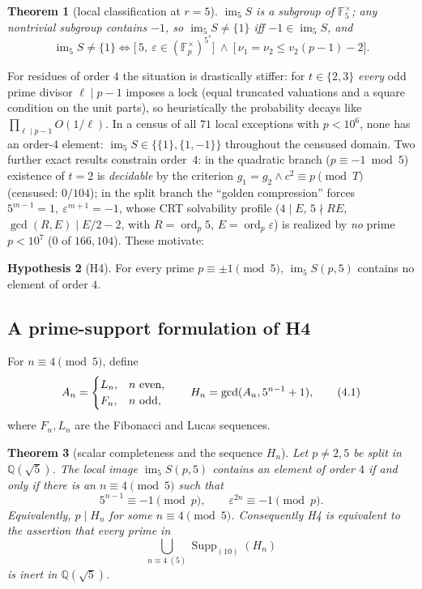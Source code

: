 \documentclass[11pt]{amsart}
\newtheorem{theorem}{Theorem}[section]
\theoremstyle{definition}
\newtheorem{hypothesis}[theorem]{Hypothesis}
\theoremstyle{remark}
\newcommand{\F}{\mathbb{F}}
\newcommand{\Q}{\mathbb{Q}}
\newcommand{\eps}{\varepsilon}
\newcommand{\ord}{\operatorname{ord}}
\newcommand{\im}{\operatorname{im}}
\begin{document}
\begin{theorem}[local classification at $r=5$]\label{thm:local-final}
$\im_5 S$ is a subgroup of $\F_5^\times$; any nontrivial subgroup contains
$-1$, so $\im_5 S \neq \{1\}$ iff $-1 \in \im_5 S$, and
\[
\im_5 S \ne \{1\}
\iff
\Big[\,5,\ \eps \in (\F_p^\times)^{5^{s}}\Big]
\ \wedge\
\Big[\,\nu_1 = \nu_2 \le v_2(p-1) - 2\Big].
\]
\end{theorem}

For residues of order $4$ the situation is drastically stiffer: for
$t \in \{2,3\}$ \emph{every} odd prime divisor $\ell \mid p - 1$ imposes a
lock (equal truncated valuations and a square condition on the unit parts),
so heuristically the probability decays like
$\prod_{\ell \mid p-1} O(1/\ell)$. In a census of all $71$ local exceptions
with $p < 10^6$, none has an order-$4$ element: $\im_5 S \in
\{\{1\}, \{1,-1\}\}$ throughout the censused domain. Two further exact
results constrain order~$4$: in the quadratic branch
($p \equiv -1 \bmod 5$) existence of $t = 2$ is \emph{decidable} by the
criterion $g_1 = g_2 \wedge c^2 \equiv p \pmod T$ (censused: $0/104$); in
the split branch the ``golden compression'' forces
$5^{m-1} = 1,\ \eps^{m+1} = -1$, whose CRT solvability profile
($4 \mid E$, $5 \nmid RE$, $\gcd(R,E) \mid E/2 - 2$, with $R = \ord_p 5$,
$E = \ord_p \eps$) is realized by \emph{no} prime $p < 10^7$ ($0$ of
$166{,}104$). These motivate:

\begin{hypothesis}[H4]\label{hyp:h4}
For every prime $p \equiv \pm1 \pmod 5$, $\im_5 S(p,5)$ contains no element
of order $4$.
\end{hypothesis}

\subsection{A prime-support formulation of H4}\label{subsec:Hsupport}

For $n\equiv4\pmod5$, define
\[
A_n=\begin{cases}
L_n,&n\ {\rm even},\\
F_n,&n\ {\rm odd},
\end{cases}
\qquad
H_n=\gcd(A_n,5^{n-1}+1),
\tag{4.1}
\]
where $F_n,L_n$ are the Fibonacci and Lucas sequences.

\begin{theorem}[scalar completeness and the sequence $H_n$]
\label{thm:Hsupport}
Let $p\ne2,5$ be split in $\Q(\sqrt5)$. The local image
$\im_5S(p,5)$ contains an element of order $4$ if and only if there is an
$n\equiv4\pmod5$ such that
\[
5^{n-1}\equiv-1\pmod p,\qquad
\eps^{2n}\equiv-1\pmod p.
\tag{4.2}
\]
Equivalently, $p\mid H_n$ for some $n\equiv4\pmod5$. Consequently H4 is
equivalent to the assertion that every prime in
\[
\bigcup_{n\equiv4\ (5)}\operatorname{Supp}_{(10)}(H_n)
\tag{4.3}
\]
is inert in $\Q(\sqrt5)$.
\end{theorem}
\end{document}
